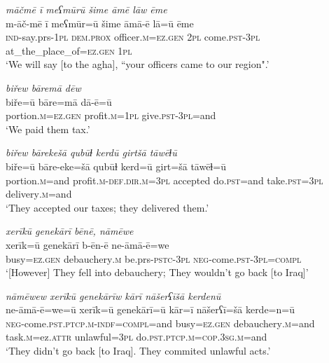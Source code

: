 \ea \label{BP.90}
\textit{māčmē ī meʕmūrū šime āmē lāw ēme} \\ 
\gll m-āč-mē ī meʕmūr=ū šime āmā-ē lā=ū ēme \\ 
 \textsc{ind-}say.prs\textsc{-\textsc{1pl}} \textsc{dem.prox} officer\textsc{.m}\textsc{=ez.gen} \textsc{2pl} come\textsc{.pst}\textsc{-3pl} at\_the\_place\_of\textsc{=ez.gen} \textsc{1pl} \\ 
\glt `We will say [to the agha], “your officers came to our region".'
\z 
 
\ea \label{BP.91}
\textit{biřew bāremā dēw} \\ 
\gll biře=ū bāre=mā dā-ē=ū \\ 
 portion\textsc{.m}\textsc{=ez.gen} profit\textsc{.m}\textsc{=\textsc{1pl}} give\textsc{.pst}\textsc{-3pl}=and \\ 
\glt `We paid them tax.'
\z 
 
\ea \label{BP.92}
\textit{biřew bārekešā qubūɫ kerdū girtšā tāwēɫū} \\ 
\gll biře=ū bāre-eke=šā qubūɫ kerd=ū girt=šā tāwēɫ=ū \\ 
 portion\textsc{.m}=and profit\textsc{.m}\textsc{-def}\textsc{.dir}\textsc{.m}\textsc{=3pl} accepted do\textsc{.pst}=and take\textsc{.pst}\textsc{=3pl} delivery\textsc{.m}=and \\ 
\glt `They accepted our taxes; they delivered them.'
\z 
 
\ea \label{BP.93}
\textit{xerīkū genekārī bēnē, nāmēwe} \\ 
\gll xerīk=ū genekārī b-ēn-ē ne-āmā-ē=we \\ 
 busy\textsc{=ez.gen} debauchery\textsc{.m} be.prs\textsc{-pstc}\textsc{-3pl} \textsc{neg-}come\textsc{.pst}\textsc{-3pl}\textsc{=compl} \\ 
\glt `[However] They fell into debauchery; They wouldn’t go back [to Iraq]'
\z 
 
\ea \label{BP.94}
\textit{nāmēwew xerīkū genekārīw kārī nāšerʕīšā kerdenū} \\ 
\gll ne-āmā-ē=we=ū xerīk=ū genekārī=ū kār=ī nāšerʕī=šā kerde=n=ū \\ 
 \textsc{neg-}come\textsc{.pst}\textsc{.ptcp}\textsc{.m}\textsc{-indf}\textsc{=compl}=and busy\textsc{=ez.gen} debauchery\textsc{.m}=and task\textsc{.m}=ez.\textsc{attr} unlawful\textsc{=3pl} do\textsc{.pst}\textsc{.ptcp}\textsc{.m}\textsc{=cop}\textsc{.3sg}\textsc{.m}=and \\ 
\glt `They didn’t go back [to Iraq]. They commited unlawful acts.'
\z 
 
